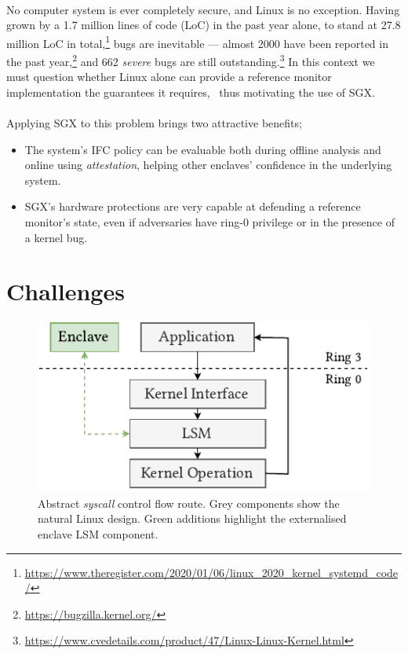 \paragraph{} No computer system is ever completely secure, and Linux is no exception. Having grown by a 1.7 million lines of code (LoC) in the past year alone, to stand at 27.8 million LoC in total,\footnote{\url{https://www.theregister.com/2020/01/06/linux\_2020\_kernel\_systemd\_code/}} bugs are inevitable --- almost 2000 have been reported in the past year,\footnote{\url{https://bugzilla.kernel.org/}} and 662 \textit{severe} bugs are still outstanding.\footnote{\url{https://www.cvedetails.com/product/47/Linux-Linux-Kernel.html}} In this context we must question whether Linux alone can provide a reference monitor implementation the guarantees it requires,~\cite{Lipp2018MeltdownRK, 10.5555/2831143.2831164} thus motivating the use of SGX.

\paragraph{} Applying SGX to this problem brings two attractive benefits;
\begin{itemize}
    \item The system's IFC policy can be evaluable both during offline analysis and online using \textit{attestation}, helping other enclaves' confidence in the underlying system.
    \item SGX's hardware protections are very capable at defending a reference monitor's state, even if adversaries have ring-0 privilege or in the presence of a kernel bug.
\end{itemize}

\section{Challenges}

\begin{figure}[]
    \centering
    \includegraphics[width=0.48\linewidth]{figures/SGX-EnclaveIntegration.pdf}
    \caption{Abstract \textit{syscall} control flow route. Grey components show the natural Linux design. Green additions highlight the externalised enclave LSM component.}
    \vspace{5mm}
    \label{fig:sgx-abstract-integration}
\end{figure}

